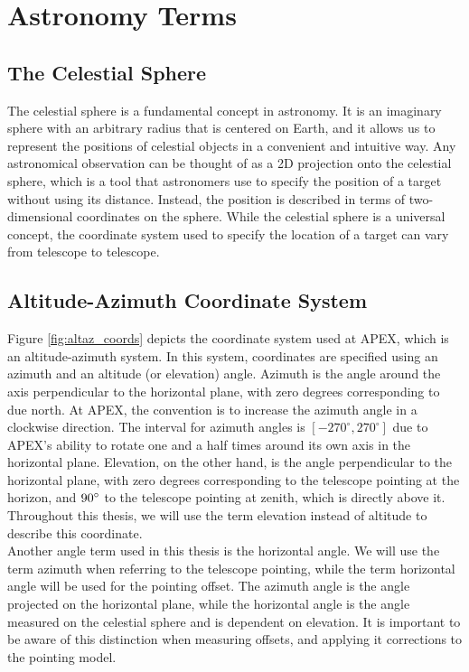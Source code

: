 \section{Astronomy Terms}
\subsection{The Celestial Sphere}
The celestial sphere is a fundamental concept in astronomy.
It is an imaginary sphere with an arbitrary radius that is centered on Earth, and it allows us to represent the positions of celestial objects in a convenient and intuitive way.
Any astronomical observation can be thought of as a 2D projection onto the celestial sphere, which is a tool that astronomers use to specify the position of a target without using its distance.
Instead, the position is described in terms of two-dimensional coordinates on the sphere.
While the celestial sphere is a universal concept, the coordinate system used to specify the location of a target can vary from telescope to telescope.




\subsection{Altitude-Azimuth Coordinate System}
Figure \ref{fig:altaz_coords} depicts the coordinate system used at APEX, which is an altitude-azimuth system.
In this system, coordinates are specified using an azimuth and an altitude (or elevation) angle.
Azimuth is the angle around the axis perpendicular to the horizontal plane, with zero degrees corresponding to due north.
At APEX, the convention is to increase the azimuth angle in a clockwise direction.
The interval for azimuth angles is $[-270^\circ,270^\circ]$ due to APEX's ability to rotate one and a half times around its own axis in the horizontal plane.
Elevation, on the other hand, is the angle perpendicular to the horizontal plane, with zero degrees corresponding to the telescope pointing at the horizon, and $90^\circ$ to the telescope pointing at zenith, which is directly above it.
Throughout this thesis, we will use the term elevation instead of altitude to describe this coordinate.\\

Another angle term used in this thesis is the horizontal angle.
We will use the term azimuth when referring to the telescope pointing, while the term horizontal angle will be used for the pointing offset.
The azimuth angle is the angle projected on the horizontal plane, while the horizontal angle is the angle measured on the celestial sphere and is dependent on elevation.
It is important to be aware of this distinction when measuring offsets, and applying it corrections to the pointing model.

